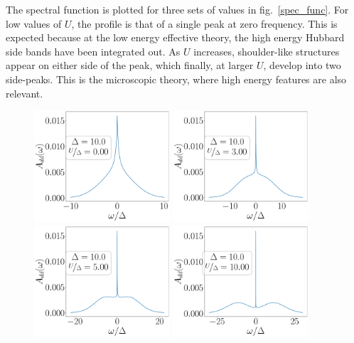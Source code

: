 \documentclass[10pt]{report}
\numberwithin{equation}{section}
\begin{document}
The spectral function is plotted for three sets of values in fig.~\ref{spec_func}. For low values of \(U\), the profile is that of a single peak at zero frequency. This is expected because at the low energy effective theory, the high energy Hubbard side bands have been integrated out. As \(U\) increases, shoulder-like structures appear on either side of the peak, which finally, at larger \(U\), develop into two side-peaks. This is the microscopic theory, where high energy features are also relevant.
\begin{figure}[!htb]
	\centering
	\includegraphics[width=0.45\textwidth]{../figures/spec_func_Ub=0_U_by_delta=0.00.pdf}
	\includegraphics[width=0.45\textwidth]{../figures/spec_func_Ub=0_U_by_delta=3.00.pdf}
	\includegraphics[width=0.45\textwidth]{../figures/spec_func_Ub=0_U_by_delta=5.00.pdf}
	\includegraphics[width=0.45\textwidth]{../figures/spec_func_Ub=0_U_by_delta=10.00.pdf}

\end{figure}
\end{document}
